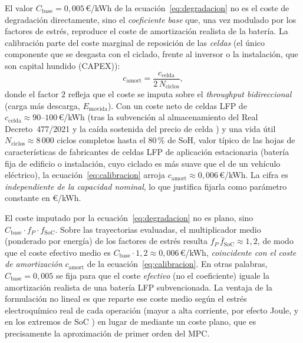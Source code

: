 \documentclass[12pt, a4paper, twoside]{report}
\begin{document}
El valor $C_{\text{base}} = 0{,}005$\,€/kWh de la ecuación~\eqref{eq:degradacion}
no es el coste de degradación directamente, sino el \emph{coeficiente base} que,
una vez modulado por los factores de estrés, reproduce el coste de amortización
realista de la batería. La calibración parte del coste marginal de reposición de
las \emph{celdas} (el único componente que se desgasta con el ciclado, frente al
inversor o la instalación, que son capital hundido (CAPEX)):
\begin{equation}
  c_{\text{amort}} = \frac{c_{\text{celda}}}{2\,N_{\text{ciclos}}},
  \label{eq:calibracion}
\end{equation}
donde el factor $2$ refleja que el coste se imputa sobre el \emph{throughput
bidireccional} (carga más descarga, $E_{\text{movida}}$). Con un coste neto de
celdas LFP de $c_{\text{celda}}\!\approx\!90\text{--}100$\,€/kWh (tras la
subvención al almacenamiento del Real Decreto~477/2021 \citep{RD477_2021} y la
caída sostenida del precio de celda \citep{BNEF2024,Schmidt2019}) y una vida útil
$N_{\text{ciclos}}\!\approx\!8\,000$ ciclos completos hasta el 80\,\% de SoH,
valor típico de las hojas de características de fabricantes de celdas LFP de
aplicación estacionaria (batería fija de edificio o instalación, cuyo ciclado
es más suave que el de un vehículo eléctrico), la
ecuación~\eqref{eq:calibracion}
arroja $c_{\text{amort}}\!\approx\!0{,}006$\,€/kWh. La cifra es \emph{independiente
de la capacidad nominal}, lo que justifica fijarla como parámetro constante en
€/kWh.

El coste imputado por la ecuación~\eqref{eq:degradacion} no es plano, sino
$C_{\text{base}}\cdot f_P\cdot f_{\text{SoC}}$. Sobre las trayectorias evaluadas, el
multiplicador medio (ponderado por energía) de los factores de estrés resulta
$\overline{f_P\,f_{\text{SoC}}}\!\approx\!1{,}2$, de modo que el coste efectivo
medio es $C_{\text{base}}\cdot 1{,}2\!\approx\!0{,}006$\,€/kWh, \emph{coincidente
con el coste de amortización} $c_{\text{amort}}$ de la
ecuación~\eqref{eq:calibracion}. En otras palabras, $C_{\text{base}}=0{,}005$ se
fija para que el coste \emph{efectivo} (no el coeficiente) iguale la amortización
realista de una batería LFP subvencionada. La ventaja de la formulación no lineal
es que reparte ese coste medio según el estrés electroquímico real de cada
operación (mayor a alta corriente, por efecto Joule, y en los extremos de SoC
\citep{Vetter2005, Xu2016}) en lugar de mediante un coste plano, que es
precisamente la aproximación de primer orden del MPC.
\end{document}
